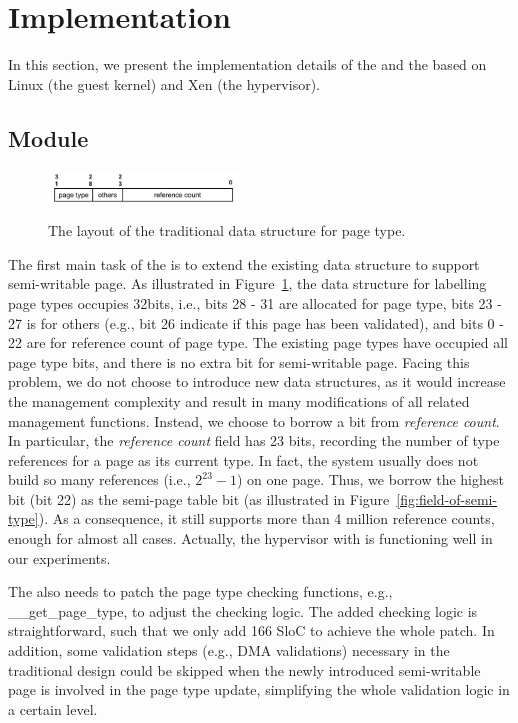 \section{Implementation} \label{sec:impl}
In this section, we present the implementation details of the \module and the \cache based on Linux (the guest kernel) and Xen (the hypervisor).

\subsection{\name Module}
\begin{figure}[ht]
\centering
\includegraphics[width=0.45\textwidth]{image/implementation/field-of-page-type-info.jpg} \\
\caption{The layout of the traditional data structure for page type.}
\label{fig:field-of-page-type-info}
\end{figure}
The first main task of the \module is to extend the existing data structure to support semi-writable page.
As illustrated in Figure~\ref{fig:field-of-page-type-info}, the data structure for labelling page types occupies 32bits, i.e., bits 28 - 31 are allocated for page type, bits 23 - 27 is for others (e.g., bit 26 indicate if this page has been validated), and bits 0 - 22 are for reference count of page type.
The existing page types have occupied all page type bits, and there is no extra bit for semi-writable page.
Facing this problem, we do not choose to introduce new data structures, as it would increase the management complexity and result in many modifications of all related management functions.
Instead, we choose to borrow a bit from \emph{reference count}.
In particular, the \emph{reference count} field has 23 bits, recording the number of type references for a page as its current type.
In fact, the system usually does not build so many references (i.e., $2^{23}-1$) on one page. Thus, we borrow the highest bit (bit 22) as the semi-page table bit (as illustrated in Figure~\ref{fig:field-of-semi-type}).
As a consequence, it still supports more than 4 million reference counts, enough for almost all cases.
Actually, the hypervisor with \name is functioning well in our experiments.

The \module also needs to patch the page type checking functions, e.g., \_\_get\_page\_type, to adjust the checking logic.
The added checking logic is straightforward, such that we only add 166 SloC to achieve the whole patch.
In addition, some validation steps (e.g., DMA validations) necessary in the traditional design could be skipped when the newly introduced semi-writable page is involved in the page type update, simplifying the whole validation logic in a certain level.

